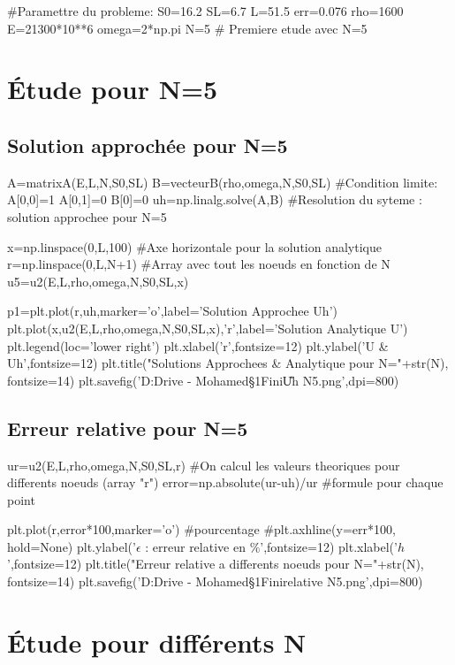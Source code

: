 \documentclass[a4paper,10pt]{report} %
\begin{document}
\begin{python}
#Paramettre du probleme:
S0=16.2
SL=6.7
L=51.5
err=0.076
rho=1600
E=21300*10**6
omega=2*np.pi
N=5 # Premiere etude avec N=5
\end{python}

\section{Étude pour N=5}
\subsection{Solution approchée pour N=5}
\begin{python}
A=matrixA(E,L,N,S0,SL)
B=vecteurB(rho,omega,N,S0,SL)
#Condition limite:
A[0,0]=1
A[0,1]=0
B[0]=0
uh=np.linalg.solve(A,B) #Resolution du syteme : solution approchee pour N=5

x=np.linspace(0,L,100) #Axe horizontale pour la solution analytique
r=np.linspace(0,L,N+1) #Array avec tout les noeuds en fonction de N
u5=u2(E,L,rho,omega,N,S0,SL,x)

p1=plt.plot(r,uh,marker='o',label='Solution Approchee Uh')
plt.plot(x,u2(E,L,rho,omega,N,S0,SL,x),'r',label='Solution Analytique U')
plt.legend(loc='lower right')
plt.xlabel('r',fontsize=12)
plt.ylabel('U & Uh',fontsize=12)
plt.title("Solutions Approchees & Analytique pour N="+str(N), fontsize=14)
plt.savefig('D:\Google Drive - Mohamed\Cours\S1\Element Fini\U Uh N5.png',dpi=800)
\end{python}
\subsection{Erreur relative pour N=5}
\begin{python}
ur=u2(E,L,rho,omega,N,S0,SL,r) #On calcul les valeurs theoriques pour differents noeuds (array "r")
error=np.absolute(ur-uh)/ur #formule pour chaque point

plt.plot(r,error*100,marker='o') #pourcentage
#plt.axhline(y=err*100, hold=None)
plt.ylabel('$\epsilon$ : erreur relative en $\%$',fontsize=12)
plt.xlabel('$h$',fontsize=12)
plt.title("Erreur relative a differents noeuds pour N="+str(N), fontsize=14)
plt.savefig('D:\Google Drive - Mohamed\Cours\S1\Element Fini\Erreur relative N5.png',dpi=800) 
\end{python}
\section{Étude pour différents N}
\end{document}
